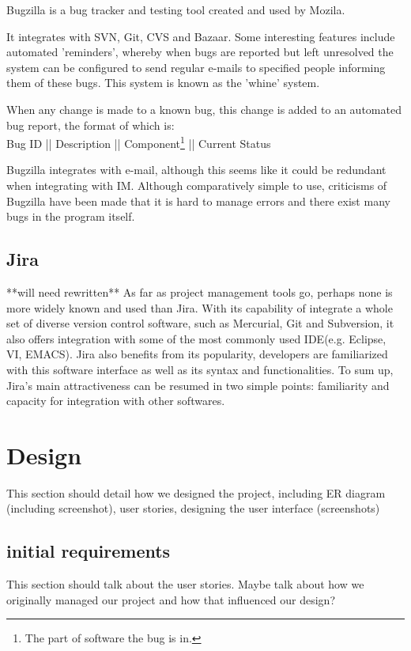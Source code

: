 \documentclass[a4paper]{l3proj}
\begin{document}
Bugzilla is a bug tracker and testing tool created and used by Mozila.

It integrates with SVN, Git, CVS and Bazaar.  Some interesting
features include automated 'reminders', whereby when bugs are
reported but left unresolved the system can be configured to send
regular e-mails to specified people informing them of these bugs.
This system is known as the 'whine' system.  

When any change is made to a known bug, this change is added to an
automated bug report, the format of which is:\\
Bug ID || Description || Component\footnote{The part of software the
  bug is in.} || Current Status

Bugzilla integrates with e-mail, although this seems like it could be
redundant when integrating with IM.  
Although comparatively simple to use, criticisms of Bugzilla have been
made that it is hard to manage errors and there exist many bugs in the
program itself.  


\section{Jira}
\label{jira}
**will need rewritten**
As far as project management tools go, perhaps none is more widely known and used than Jira. 
With its capability of integrate a whole set of diverse version control software, such as Mercurial, 
Git and Subversion, it also offers integration with some of the most commonly used IDE(e.g. Eclipse, VI, EMACS). 
Jira also benefits from its popularity, developers are familiarized with this software interface as well as its 
syntax and functionalities. To sum up, Jira’s main attractiveness can be resumed in two simple points: familiarity
and capacity for integration with other softwares.


\chapter{Design}
\label{design}

This section should detail how we designed the project, including ER diagram (including screenshot),
user stories, designing the user interface (screenshots)

\section{initial requirements}

This section should talk about the user stories.  Maybe talk about how we originally managed our project and 
how that influenced our design?
\end{document}

